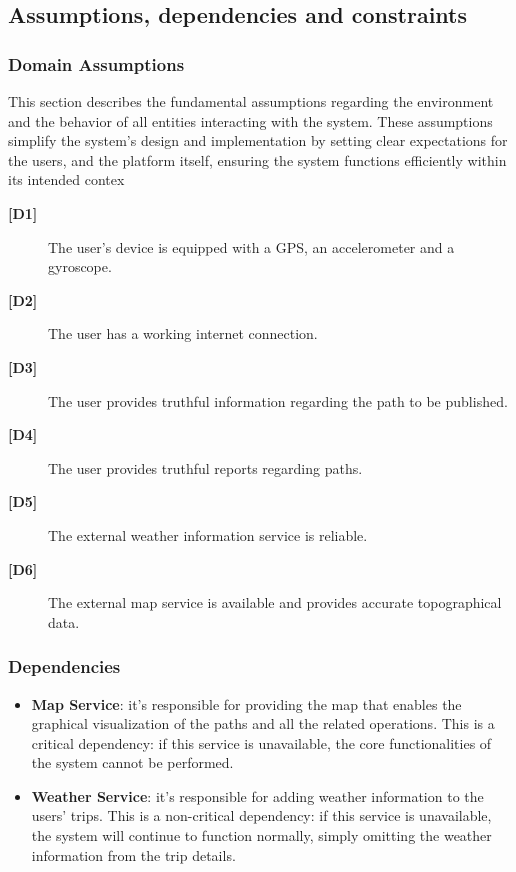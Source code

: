 \newpage
\subsection{Assumptions, dependencies and constraints}

    \subsubsection{Domain Assumptions}
    \noindent
    This section describes the fundamental assumptions regarding the environment and the behavior of all entities interacting with the system. These assumptions simplify the system’s design and implementation by setting clear expectations for the users, and the platform itself, ensuring the system functions efficiently within its intended contex

    \begin{description}
        \item[\textbf{[D1]}] The user’s device is equipped with a GPS, an accelerometer and a gyroscope.
        \item[\textbf{[D2]}] The user has a working internet connection.
        \item[\textbf{[D3]}] The user provides truthful information regarding the path to be published.
        \item[\textbf{[D4]}] The user provides truthful reports regarding paths.
        \item[\textbf{[D5]}] The external weather information service is reliable.
        \item[\textbf{[D6]}] The external map service is available and provides accurate topographical data.
    \end{description}

    \subsubsection{Dependencies}
    \noindent
    \begin{itemize}
    \item \textbf{Map Service}: it's responsible for providing the map that enables the graphical visualization of the paths and all the related operations. This is a critical dependency: if this service is unavailable, the core functionalities of the system cannot be performed.
    \item \textbf{Weather Service}: it's responsible for adding weather information to the users’ trips. This is a non-critical dependency: if this service is unavailable, the system will continue to function normally, simply omitting the weather information from the trip details. 
    \end{itemize}